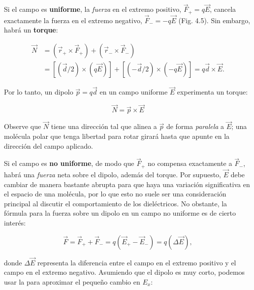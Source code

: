 \documentclass[12pt,a4paper]{report}
\newcommand{\esp}{\vspace{0.5cm}}
\begin{document}
	\esp
	
	Si el campo es \textbf{uniforme}, la \textit{fuerza} en el extremo positivo, $\vec{F}_+ = q\vec{E}$, cancela exactamente la fuerza en el extremo negativo, $\vec{F}_- = -q\vec{E}$ (Fig. 4.5). Sin embargo, habrá un \textbf{torque}:
	
	\esp
	
	\begin{align*}
		\vec{N} &= (\vec{r}_+ \times \vec{F}_+) + (\vec{r}_- \times \vec{F}_-) \\
		&= [(\vec{d}/2) \times (q\vec{E})] + [(-\vec{d}/2) \times (-q\vec{E})] = q\vec{d} \times \vec{E}.
	\end{align*}
	
	\esp
	
	\noindent Por lo tanto, un dipolo $\vec{p} = q\vec{d}$ en un campo uniforme $\vec{E}$ experimenta un torque:
	
	\esp
	
	\begin{equation}
		\vec{N} = \vec{p} \times \vec{E}
	\end{equation}

	\esp

	Observe que $\vec{N}$ tiene una dirección tal que alinea a $\vec{p}$ de forma \textit{paralela} a $\vec{E}$; una molécula polar que tenga libertad para rotar girará hasta que apunte en la dirección del campo aplicado.
	
	\esp	
	
	Si el campo es \textbf{no uniforme}, de modo que $\vec{F}_+$ no compensa exactamente a $\vec{F}_-$, habrá una \textit{fuerza} neta sobre el dipolo, además del torque. Por supuesto, $\vec{E}$ debe cambiar de manera bastante abrupta para que haya una variación significativa en el espacio de una molécula, por lo que esto no suele ser una consideración principal al discutir el comportamiento de los dieléctricos. No obstante, la fórmula para la fuerza sobre un dipolo en un campo no uniforme es de cierto interés:
	
	\esp
	
	\begin{equation*}
		\vec{F} = \vec{F}_+ + \vec{F}_- = q(\vec{E}_+ - \vec{E}_-) = q(\Delta \vec{E}),
	\end{equation*}
	
	\esp
	
	donde $\Delta \vec{E}$ representa la diferencia entre el campo en el extremo positivo y el campo en el extremo negativo. Asumiendo que el dipolo es muy corto, podemos usar la para aproximar el pequeño cambio en $E_x$:
	
\end{document}
